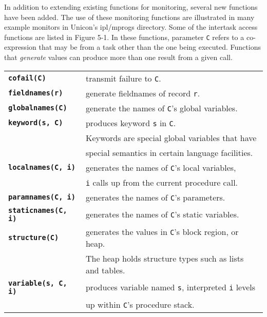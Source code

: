 
In addition to extending existing functions for monitoring,
several new functions have been added.  The use of these monitoring functions
are illustrated in many example monitors in Unicon's
ipl/mprogs directory.  Some of the intertask access functions
are listed in Figure 5-1.  In these functions, parameter {\tt C}
refers to a co-expression that may be from a task other than the one being
executed.  Functions that {\em generate\/}
values can produce more than one result from a given call.

\begin{center}

\begin{tabular}{|ll|} \hline
{\bf\tt cofail(C)}      & transmit failure to {\tt C}. \\
{\bf\tt fieldnames(r)}  & generate fieldnames of record {\tt r}. \\
{\bf\tt globalnames(C)} & generate the names of {\tt C}'s global variables. \\
{\bf\tt keyword(s, C)} & produces keyword {\tt s} in {\tt C}. \\
	& Keywords are special global variables that have \\
	& special semantics in certain language facilities.\\
{\bf\tt localnames(C, i)} & generates the names of {\tt C}'s local variables,\\
	& {\tt i} calls up from the current procedure call. \\
{\bf\tt paramnames(C, i)} & generates the names of {\tt C}'s parameters. \\
{\bf\tt staticnames(C, i)} & generates the names of {\tt C}'s static variables. \\
{\bf\tt structure(C)} & generates the values in {\tt C}'s block
region, or heap. \\
	 & The heap holds structure types such as lists and tables. \\
{\bf\tt variable(s, C, i)} & produces variable named {\tt s}, interpreted {\tt i} levels\\
	& up within {\tt C}'s procedure stack. \\
\hline
\end{tabular}
\end{center}

